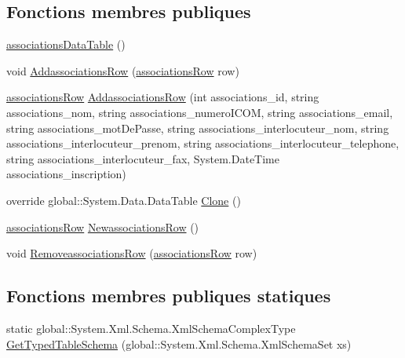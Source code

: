\subsection*{Fonctions membres publiques}
\begin{DoxyCompactItemize}
\item 
\hyperlink{classforma_1_1formadb_data_set_1_1associations_data_table_a2df1e0f9f1ed63822ef6039ecdfb73ef}{associations\+Data\+Table} ()
\item 
void \hyperlink{classforma_1_1formadb_data_set_1_1associations_data_table_a60b1327114a767d7fc20435250ea3926}{Addassociations\+Row} (\hyperlink{classforma_1_1formadb_data_set_1_1associations_row}{associations\+Row} row)
\item 
\hyperlink{classforma_1_1formadb_data_set_1_1associations_row}{associations\+Row} \hyperlink{classforma_1_1formadb_data_set_1_1associations_data_table_a5f2325af0b29fed689537aa458f8aceb}{Addassociations\+Row} (int associations\+\_\+id, string associations\+\_\+nom, string associations\+\_\+numero\+I\+C\+OM, string associations\+\_\+email, string associations\+\_\+mot\+De\+Passe, string associations\+\_\+interlocuteur\+\_\+nom, string associations\+\_\+interlocuteur\+\_\+prenom, string associations\+\_\+interlocuteur\+\_\+telephone, string associations\+\_\+interlocuteur\+\_\+fax, System.\+Date\+Time associations\+\_\+inscription)
\item 
override global\+::\+System.\+Data.\+Data\+Table \hyperlink{classforma_1_1formadb_data_set_1_1associations_data_table_ad432e69c4fef9a903ab968a4f49ee2da}{Clone} ()
\item 
\hyperlink{classforma_1_1formadb_data_set_1_1associations_row}{associations\+Row} \hyperlink{classforma_1_1formadb_data_set_1_1associations_data_table_a6635de00b2fb1070705f6e71ec22aca2}{Newassociations\+Row} ()
\item 
void \hyperlink{classforma_1_1formadb_data_set_1_1associations_data_table_a4e1598e09b087af7d1999f2065356fa3}{Removeassociations\+Row} (\hyperlink{classforma_1_1formadb_data_set_1_1associations_row}{associations\+Row} row)
\end{DoxyCompactItemize}
\subsection*{Fonctions membres publiques statiques}
\begin{DoxyCompactItemize}
\item 
static global\+::\+System.\+Xml.\+Schema.\+Xml\+Schema\+Complex\+Type \hyperlink{classforma_1_1formadb_data_set_1_1associations_data_table_afffcfbee30f02262ad3beb1844616b98}{Get\+Typed\+Table\+Schema} (global\+::\+System.\+Xml.\+Schema.\+Xml\+Schema\+Set xs)
\end{DoxyCompactItemize}
